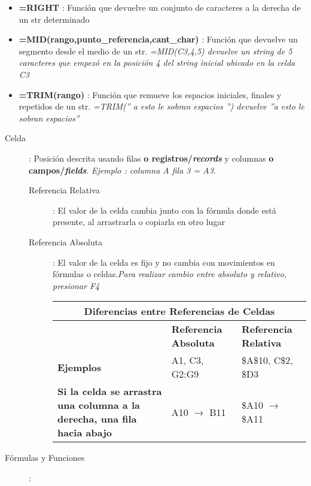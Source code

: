 \begin{itemize}
    \item {\textbf{=RIGHT} : Función que devuelve un conjunto de caracteres a la derecha de un \gls{str} determinado}
    \item {\textbf{=MID(rango,punto\_referencia,cant\_char)} : Función que devuelve un segmento desde el medio de un \gls{str}. \textit{=MID(C3,4,5) devuelve un string de 5 caracteres que empezó en la posición 4 del string inicial ubicado en la celda C3}}
    \item {\textbf{=TRIM(rango)} : Función que remueve los espacios iniciales, finales y repetidos de un \gls{str}. \textit{=TRIM('' a esto le sobran espacios  '') devuelve ''a esto le sobran espacios''}}    
\end{itemize}

\begin{description}
    \item[Celda]{ : Posición descrita usando filas \textbf{o registros/\textit{records}} y columnas \textbf{o campos/\textit{fields}}. \textit{Ejemplo : columna A fila 3 = A3}. 
    \begin{description}
        \item[Referencia Relativa]{ : El valor de la celda cambia junto con la fórmula donde está presente, al arrastrarla o copiarla en otro lugar}
        \item[Referencia Absoluta]{ : El valor de la celda es fijo y no cambia con movimientos en fórmulas o celdas.\textit{Para realizar cambio entre absoluto y relativo, presionar F4}}
        \begin{table}
            \centering
            \begin{tabular}{|p{5cm}|p{4.5cm}|p{4.5cm}|}
                \hline
                \multicolumn{3}{|c|}{Diferencias entre Referencias de Celdas} \\
                \hline
                & \textbf{Referencia Absoluta} & \textbf{Referencia Relativa} \\
                \hline
                \textbf{Ejemplos} & A1, C3, G2:G9 & \$A\$10, C\$2, \$D3 \\
                \hline
                \textbf{Si la celda se arrastra una columna a la derecha, una fila hacia abajo} & A10 $\rightarrow$ B11 & \$A10 $\rightarrow$ \$A11 \\
                \hline
            \end{tabular}
        \end{table}
    \end{description}}
    \item[Fórmulas y Funciones]{ : 
}
\end{description}
